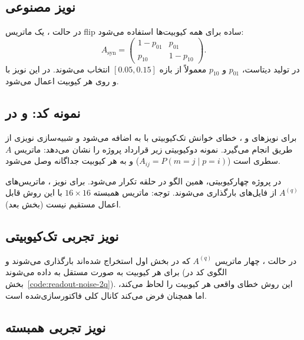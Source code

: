 \subsection{نویز مصنوعی}

در حالت ، یک ماتریس flip ساده برای همه کیوبیت‌ها استفاده می‌شود:
\begin{equation}
	A_{\mathrm{syn}}
	=
	\begin{pmatrix}
	1-p_{01} & p_{01}\\
	p_{10} & 1-p_{10}
	\end{pmatrix}.
	\label{eq:synthetic}
\end{equation}
در تولید دیتاست، $p_{01}$ و $p_{10}$ معمولاً از بازه $[0.05,0.15]$ انتخاب می‌شوند. در  این نویز با  و  روی هر کیوبیت اعمال می‌شود.

\subsection{نمونه کد:  و  در }

برای نویزهای  و ، خطای خوانش تک‌کیوبیتی با  به  اضافه می‌شود و شبیه‌سازی نویزی از طریق  انجام می‌گیرد. نمونه دوکیوبیتی زیر قرارداد پروژه را نشان می‌دهد: ماتریس $A$ سطری است ($A_{ij}=P(m=j\mid p=i)$) و به هر کیوبیت جداگانه وصل می‌شود.


در پروژه چهارکیوبیتی، همین الگو در حلقه  تکرار می‌شود. برای نویز ، ماتریس‌های $A^{(q)}$ از فایل‌های  بارگذاری می‌شوند. توجه: ماتریس همبسته $16\times16$ با این روش قابل اعمال مستقیم نیست (بخش بعد).

\subsection{نویز تجربی تک‌کیوبیتی}

در حالت ، چهار ماتریس $A^{(q)}$ که در بخش اول استخراج شده‌اند بارگذاری می‌شوند و برای هر کیوبیت به صورت مستقل به  داده می‌شوند (الگوی کد در بخش~\ref{code:readout-noise-2q}).
این روش خطای واقعی هر کیوبیت را لحاظ می‌کند، اما همچنان فرض می‌کند کانال کلی فاکتورسازی‌شده است.

\subsection{نویز تجربی همبسته}

